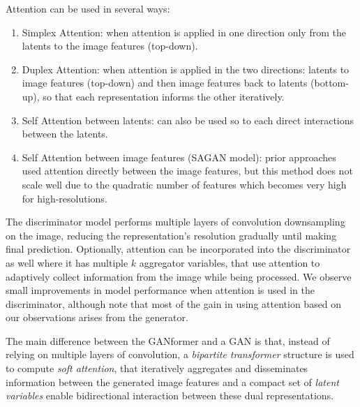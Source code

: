 \documentclass{article}
\begin{document}
	Attention can be used in several ways: 
	\begin{enumerate}
		\item Simplex Attention: when attention is applied in one direction only from the latents to the 
		image features (top-down).
		\item Duplex Attention: when attention is applied in the two directions: latents to image features 
		(top-down) and then image features back to latents (bottom-up), so that each representation 
		informs the other iteratively.
		\item Self Attention between latents: can also be used so to each direct interactions between the 
		latents.
		\item Self Attention between image features (SAGAN model): prior approaches used attention 
		directly 
		between the image features, but this method does not scale well due to the quadratic number of 
		features which becomes very high for high-resolutions.
	\end{enumerate}

	The discriminator model performs multiple layers of convolution downsampling on the image, 
	reducing the representation's resolution gradually until making final prediction. 
	Optionally, attention can be incorporated into the discriminator as well where it has multiple $k$ 
	aggregator variables, that use attention to adaptively collect information from the image while being 
	processed. We observe small improvements in model performance when attention is used in the 
	discriminator, although note that most of the gain in using attention based on our observations 
	arises from the generator.
	
	The main difference between the GANformer and a GAN is that, instead of relying on multiple layers 
	of convolution, a \textit{bipartite transformer} structure is used to compute \textit{soft attention}, 
	that iteratively aggregates and disseminates information between the generated image features and 
	a compact set of \textit{latent variables} enable bidirectional interaction between these dual 
	representations. 
	
\end{document}

